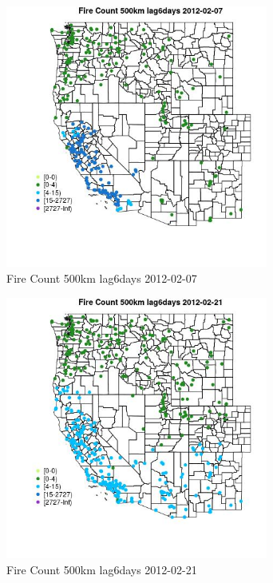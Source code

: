 \begin{figure} 
\centering  
\includegraphics[width=0.77\textwidth]{Code_Outputs/Report_ML_input_PM25_Step4_part_f_de_duplicated_aves_prioritize_24hr_obswNAs_MapObsFire_Count_500km_lag6days2012-02-07.jpg} 
\caption{\label{fig:Report_ML_input_PM25_Step4_part_f_de_duplicated_aves_prioritize_24hr_obswNAsMapObsFire_Count_500km_lag6days2012-02-07}Fire Count 500km lag6days 2012-02-07} 
\end{figure} 
 

\clearpage 

\begin{figure} 
\centering  
\includegraphics[width=0.77\textwidth]{Code_Outputs/Report_ML_input_PM25_Step4_part_f_de_duplicated_aves_prioritize_24hr_obswNAs_MapObsFire_Count_500km_lag6days2012-02-21.jpg} 
\caption{\label{fig:Report_ML_input_PM25_Step4_part_f_de_duplicated_aves_prioritize_24hr_obswNAsMapObsFire_Count_500km_lag6days2012-02-21}Fire Count 500km lag6days 2012-02-21} 
\end{figure} 
 


